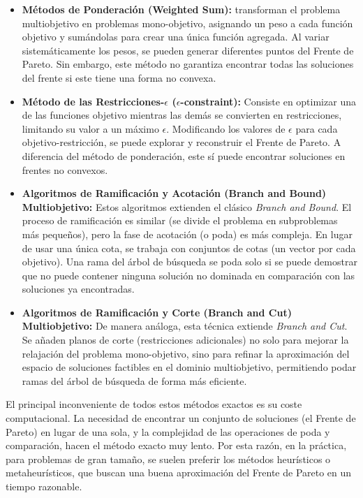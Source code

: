 \documentclass[12pt,a4paper]{book}
\begin{document}
\begin{itemize}
    \item \textbf{Métodos de Ponderación (Weighted Sum):} transforman el problema multiobjetivo en problemas mono-objetivo, asignando un peso a cada función objetivo y sumándolas para crear una única función agregada. Al variar sistemáticamente los pesos, se pueden generar diferentes puntos del Frente de Pareto. Sin embargo, este método no garantiza encontrar todas las soluciones del frente si este tiene una forma no convexa.

    \item \textbf{Método de las Restricciones-$\epsilon$ ($\epsilon$-constraint):} Consiste en optimizar una de las funciones objetivo mientras las demás se convierten en restricciones, limitando su valor a un máximo $\epsilon$. Modificando los valores de $\epsilon$ para cada objetivo-restricción, se puede explorar y reconstruir el Frente de Pareto. A diferencia del método de ponderación, este sí puede encontrar soluciones en frentes no convexos.

    \item \textbf{Algoritmos de Ramificación y Acotación (Branch and Bound) Multiobjetivo:} Estos algoritmos extienden el clásico \textit{Branch and Bound}. El proceso de ramificación es similar (se divide el problema en subproblemas más pequeños), pero la fase de acotación (o poda) es más compleja. En lugar de usar una única cota, se trabaja con conjuntos de cotas (un vector por cada objetivo). Una rama del árbol de búsqueda se poda solo si se puede demostrar que no puede contener ninguna solución no dominada en comparación con las soluciones ya encontradas.

    \item \textbf{Algoritmos de Ramificación y Corte (Branch and Cut) Multiobjetivo:} De manera análoga, esta técnica extiende \textit{Branch and Cut}. Se añaden planos de corte (restricciones adicionales) no solo para mejorar la relajación del problema mono-objetivo, sino para refinar la aproximación del espacio de soluciones factibles en el dominio multiobjetivo, permitiendo podar ramas del árbol de búsqueda de forma más eficiente.
\end{itemize}

El principal inconveniente de todos estos métodos exactos es su coste computacional. La necesidad de encontrar un conjunto de soluciones (el Frente de Pareto) en lugar de una sola, y la complejidad de las operaciones de poda y comparación, hacen el método exacto muy lento. Por esta razón, en la práctica, para problemas de gran tamaño, se suelen preferir los métodos heurísticos o metaheurísticos, que buscan una buena aproximación del Frente de Pareto en un tiempo razonable.
\end{document}
